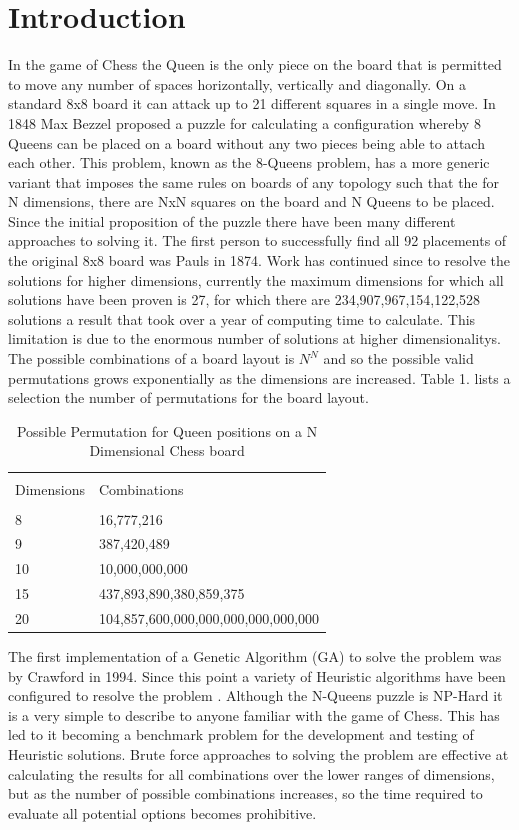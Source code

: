 \documentclass[a4paper,onecolumn,11pt]{article}
\begin{document}
\section{Introduction}
In the game of Chess the Queen is the only piece on the board that is permitted to move any number of spaces horizontally, vertically and diagonally. On a standard 8x8 board it can attack up to 21 different squares in a single move. In 1848 Max Bezzel proposed a puzzle for calculating a configuration whereby 8 Queens can be placed on a board without any two pieces being able to attach each other. This problem, known as the 8-Queens problem, has a more generic variant that imposes the same rules on boards of any topology such that the for N dimensions, there are NxN squares on the board and N Queens to be placed. Since the initial proposition of the puzzle there have been many different approaches to solving it. The first person to successfully find all 92 placements of the original 8x8 board was Pauls \cite{Pauls} in 1874. Work has continued since to resolve the solutions for higher dimensions, currently the maximum dimensions for which all solutions have been proven is 27, for which there are 234,907,967,154,122,528 solutions a result that took over a year of computing time to calculate\cite{27Queens}. This limitation is due to the enormous number of solutions at higher dimensionalitys. The possible combinations of a board layout is $N^{N}$ and so the possible valid permutations grows exponentially as the dimensions are increased. Table 1. lists a selection the number of permutations for the board layout.

\begin{table}[h]
	\caption{Possible Permutation for Queen positions on a N Dimensional Chess board} %
	\begin{tabular}{l l} 
		\hline\\
		Dimensions & Combinations \\
		\hline\\
		8 & 16,777,216 \\ 
		9 & 387,420,489 \\
		10 & 10,000,000,000 \\
		15 & 437,893,890,380,859,375 \\
		20 & 104,857,600,000,000,000,000,000,000
	\end{tabular}
\end{table}

The first implementation of a Genetic Algorithm (GA) to solve the problem was by Crawford \cite{Crawford} in 1994. Since this point a variety of Heuristic algorithms have been configured to resolve the problem \cite{AdvanceMutation} \cite{ACO} \cite{comparison} \cite{PSO}. Although the N-Queens puzzle is NP-Hard it is a very simple to describe to anyone familiar with the game of Chess. This has led to it becoming a benchmark problem for the development and testing of Heuristic solutions. Brute force approaches to solving the problem are effective at calculating the results for all combinations over the lower ranges of dimensions, but as the number of possible combinations increases, so the time required to evaluate all potential options becomes prohibitive.
\end{document}
